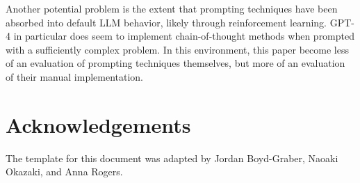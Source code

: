 \documentclass[11pt]{article}
\begin{document}
Another potential problem is the extent that prompting techniques have been absorbed into default LLM behavior, likely through reinforcement learning. GPT-4 in particular does seem to implement chain-of-thought methods when prompted with a sufficiently complex problem. In this environment, this paper become less of an evaluation of prompting techniques themselves, but more of an evaluation of their manual implementation.

\section*{Acknowledgements}
The template for this document was adapted by Jordan Boyd-Graber, Naoaki Okazaki, and Anna Rogers.



\end{document}
